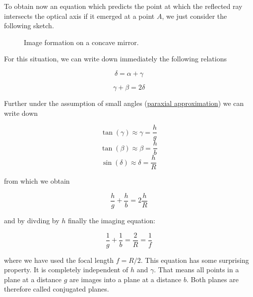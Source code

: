 \documentclass[
  a4paper,
]{book}
\begin{document}
To obtain now an equation which predicts the point at which the
reflected ray intersects the optical axis if it emerged at a point
\(A\), we just consider the following sketch.

\begin{figure}


\caption{\label{fig-concave-mirror}Image formation on a concave mirror.}

\end{figure}%

For this situation, we can write down immediately the following
relations

\[\delta=\alpha+\gamma\]

\[\gamma+\beta=2\delta\]

Further under the assumption of small angles
(\hyperref[paraxial-approximation]{paraxial approximation}) we can write
down

\[\tan(\gamma) \approx \gamma = \frac{h}{g}\]
\[\tan(\beta) \approx \beta = \frac{h}{b}\]
\[\sin(\delta) \approx \delta = \frac{h}{R}\]

from which we obtain

\[\frac{h}{g}+\frac{h}{b}=2\frac{h}{R}\]

and by divding by \(h\) finally the imaging equation:

\[\frac{1}{g}+\frac{1}{b}= \frac{2}{R}= \frac{1}{f}\]

where we have used the focal length \(f=R/2\). This equation has some
surprising property. It is completely independent of \(h\) and
\(\gamma\). That means all points in a plane at a distance \(g\) are
images into a plane at a distance \(b\). Both planes are therefore
called conjugated planes.
\end{document}
